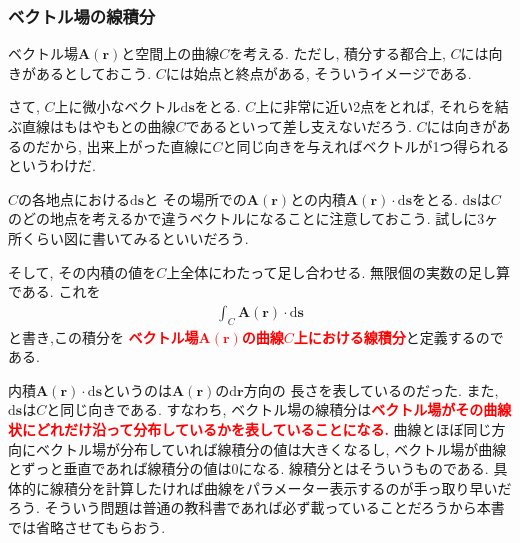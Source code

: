 \subsubsection{ベクトル場の線積分}
ベクトル場$\bm{A}(\bm{r})$と空間上の曲線$C$を考える. ただし, 積分する都合上, $C$には向きがあるとしておこう. 
$C$には始点と終点がある, そういうイメージである. 

さて, $C$上に微小なベクトル$\mathrm{d}\bm{s}$をとる. $C$上に非常に近い2点をとれば, 
それらを結ぶ直線はもはやもとの曲線$C$であるといって差し支えないだろう. $C$には向きがあるのだから, 
出来上がった直線に$C$と同じ向きを与えればベクトルが1つ得られるというわけだ. 
\begin{center}
\end{center}

$C$の各地点における$\mathrm{d}\bm{s}$と
その場所での$\bm{A}(\bm{r})$との内積$\bm{A}(\bm{r}) \cdot \mathrm{d}\bm{s}$をとる. 
$\mathrm{d}\bm{s}$は$C$のどの地点を考えるかで違うベクトルになることに注意しておこう. 
試しに3ヶ所くらい図に書いてみるといいだろう. 

そして, その内積の値を$C$上全体にわたって足し合わせる. 無限個の実数の足し算である. これを
\begin{eqnarray}
\int_{C}^{} \bm{A}(\bm{r}) \cdot \mathrm{d} \bm{s} 
\label{eq:sensekibun}
\end{eqnarray}
と書き,この積分を
\textbf{\textcolor{red}{ベクトル場$\bm{A}(\bm{r})$の曲線$C$上における線積分}}と定義するのである. 

内積$\bm{A}(\bm{r}) \cdot \mathrm{d} \bm{s}$というのは$\bm{A}(\bm{r})$の$\mathrm{d} \bm{r}$方向の
長さを表しているのだった. また, $\mathrm{d}\bm{s}$は$C$と同じ向きである. 
すなわち, ベクトル場の線積分は\textbf{\textcolor{red}{ベクトル場がその曲線状にどれだけ沿って分布しているかを表していることになる.}}
曲線とほぼ同じ方向にベクトル場が分布していれば線積分の値は大きくなるし, 
ベクトル場が曲線とずっと垂直であれば線積分の値は0になる. 
線積分とはそういうものである. 具体的に線積分を計算したければ曲線をパラメーター表示するのが手っ取り早いだろう. 
そういう問題は普通の教科書であれば必ず載っていることだろうから本書では省略させてもらおう. 

